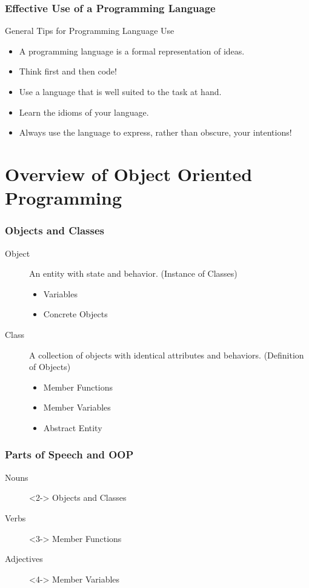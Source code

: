 \documentclass[handout]{beamer}
\begin{document}
\begin{frame}
   \frametitle{Effective Use of a Programming Language}
   General Tips for Programming Language Use
   \begin{itemize}
   \item<2-> A programming language is a formal representation of ideas.
   \item<3-> Think first and then code!
   \item<4-> Use a language that is well suited to the task at hand.
   \item<5-> Learn the idioms of your language.
   \item<6-> Always use the language to express, rather than obscure, 
       your intentions!
   \end{itemize}
\end{frame}

\section{Overview of Object Oriented Programming}

\begin{frame}
   \frametitle{Objects and Classes}
   \begin{description}
   \item[Object] An entity with state and behavior. (Instance of Classes)
     \begin{itemize}
     \item<2-> Variables
     \item<2-> Concrete Objects
     \end{itemize}
   \item[Class] A collection of objects with identical attributes and
     behaviors.  (Definition of Objects)
     \begin{itemize}
     \item<3-> Member Functions
     \item<3-> Member Variables
     \item<3-> Abstract Entity
   \end{itemize}
   \end{description}
\end{frame}

\begin{frame}
   \frametitle{Parts of Speech and OOP}
   \begin{description}
   \item[Nouns]<2-> Objects and Classes
   \item[Verbs]<3-> Member Functions
   \item[Adjectives]<4-> Member Variables
   \end{description}
\end{frame}
\end{document}
